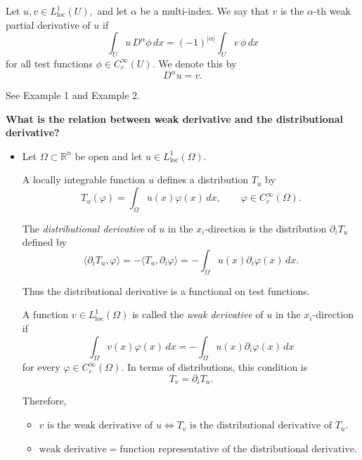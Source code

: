 \begin{definition}
Let
$
u,v\in L^1_{\mathrm{loc}}(U),
$
and let $\alpha$ be a multi-index.
We say that $v$ is the $\alpha$-th weak partial derivative of $u$ if
$$
\int_U u\,D^\alpha \phi\,dx
=
(-1)^{|\alpha|}
\int_U v\,\phi\,dx
$$
for all test functions
$
\phi\in C_c^\infty(U).
$
We denote this by
$$
D^\alpha u=v.
$$
\end{definition}

\begin{example}
See Example 1 and Example 2.
\end{example}

\begin{remark}
    \textbf{What is the relation between weak derivative and the distributional derivative?}
    \begin{itemize}
        \item 
        Let $\Omega \subset \mathbb{R}^n$ be open and let
        $u \in L^1_{\mathrm{loc}}(\Omega)$.
        
        A locally integrable function $u$ defines a distribution $T_u$ by
        \[
        T_u(\varphi)
        =
        \int_\Omega u(x)\varphi(x)\,dx,
        \qquad
        \varphi \in C_c^\infty(\Omega).
        \]
        
        The \emph{distributional derivative} of $u$ in the $x_i$-direction is
        the distribution $\partial_i T_u$ defined by
        \[
        \langle \partial_i T_u,\varphi\rangle
        =
        -\langle T_u,\partial_i\varphi\rangle
        =
        -\int_\Omega u(x)\partial_i\varphi(x)\,dx.
        \]

        
        Thus the distributional derivative is a functional on test functions.
        
        A function $v \in L^1_{\mathrm{loc}}(\Omega)$ is called the
        \emph{weak derivative} of $u$ in the $x_i$-direction if
        \[
        \int_\Omega v(x)\varphi(x)\,dx
        =
        -\int_\Omega u(x)\partial_i\varphi(x)\,dx
        \]
        for every $\varphi \in C_c^\infty(\Omega)$.
        In terms of distributions, this condition is
        \[
        T_v = \partial_i T_u.
        \]
        
        Therefore,
        \begin{itemize}
            \item $
                v \text{ is the weak derivative of } u
                \iff
                T_v \text{ is the distributional derivative of } T_u.
                $
            \item $
                \text{weak derivative}
                =
                \text{function representative of the distributional derivative}.
                $
        \end{itemize}
        

\end{itemize}
\end{remark}
